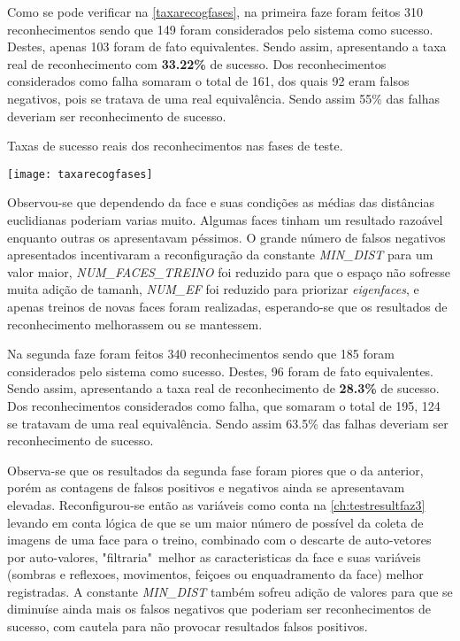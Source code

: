 Como se pode verificar na \autoref{taxarecogfases}, na primeira faze foram feitos 310 reconhecimentos sendo que 149 foram considerados pelo sistema como sucesso. Destes, apenas 103 foram de fato equivalentes. Sendo assim, apresentando a taxa real de reconhecimento com \textbf{33.22\%} de sucesso. Dos reconhecimentos considerados como falha somaram o total de 161, dos quais 92 eram falsos negativos, pois se tratava de uma real equivalência. Sendo assim 55\% das falhas deveriam ser reconhecimento de sucesso. 

\begin{table}[h]
	\centering
	\caption{Taxas de sucesso reais dos reconhecimentos nas fases de teste.}
	\texttt{[image: taxarecogfases]}
	\label{taxarecogfases}
\end{table}

Observou-se que dependendo da face e suas condições as médias das distâncias euclidianas poderiam varias muito. Algumas faces tinham um resultado razoável enquanto outras os apresentavam péssimos. O grande número de falsos negativos apresentados incentivaram a reconfiguração da constante \textit{MIN\_DIST} para um valor maior, \textit{NUM\_FACES\_TREINO} foi reduzido para que o espaço não sofresse muita adição de tamanh, \textit{NUM\_EF} foi reduzido para priorizar \textit{eigenfaces}, e apenas treinos de novas faces foram realizadas, esperando-se que os resultados de reconhecimento melhorassem ou se mantessem.


Na segunda faze foram feitos 340 reconhecimentos sendo que 185 foram considerados pelo sistema como sucesso. Destes, 96 foram de fato equivalentes. Sendo assim, apresentando a taxa real de reconhecimento de \textbf{28.3\%} de sucesso. Dos reconhecimentos considerados como falha, que somaram o total de 195, 124 se tratavam de uma real equivalência. Sendo assim 63.5\% das falhas deveriam ser reconhecimento de sucesso.

Observa-se que os resultados da segunda fase foram piores que o da anterior, porém as contagens de falsos positivos e negativos ainda se apresentavam elevadas. Reconfigurou-se então as variáveis como conta na \autoref{ch:testresultfaz3} levando em conta lógica de que se um maior número de possível da coleta de imagens de uma face para o treino, combinado com o descarte de auto-vetores por auto-valores, "filtraria"\ melhor as caracteristicas da face e suas variáveis (sombras e reflexoes, movimentos, feiçoes ou enquadramento da face) melhor registradas. A constante \textit{MIN\_DIST} também sofreu adição de valores para que se diminuíse ainda mais os falsos negativos que poderiam ser reconhecimentos de sucesso, com cautela para não provocar resultados falsos positivos.

